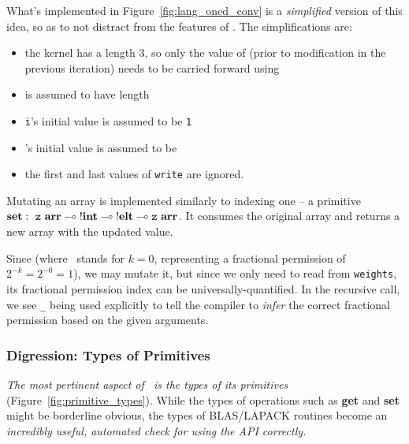 What's implemented in Figure~\ref{fig:lang_oned_conv} is a \emph{simplified}
version of this idea, so as to not distract from the features of \lang. The
simplifications are:
\begin{itemize}
    \item the kernel has a length 3, so only the value of 
        (prior to modification in the previous iteration) needs to be carried
        forward using 
    \item {} is assumed to have length 
    \item \texttt{i}'s initial value is assumed to be \texttt{1}
    \item {}'s initial value is assumed to be 
    \item the first and last values of \texttt{write} are ignored.
\end{itemize}

Mutating an array is implemented similarly to indexing one -- a primitive
$\mathbf{set}:\ {\texttt{z}\ \mathbf{arr}} \multimap {!\mathbf{int}} \multimap {!\mathbf{elt}} \multimap
{\texttt{z}\ \mathbf{arr}}$. It consumes the original array and returns a new array with
the updated value.

Since  (where \Zf\ stands for $k=0$, representing a
fractional permission of $2^{-k} = 2^{-0} = 1$), we may mutate it, but since we
only need to read from \texttt{weights}, its fractional permission index can be
universally-quantified. In the recursive call, we see \texttt{\_} being used
explicitly to tell the compiler to \emph{infer} the correct fractional
permission based on the given arguments.

\subsubsection{Digression: Types of Primitives}

\emph{The most pertinent aspect of \lang\ is the types of its primitives}
(Figure~\ref{fig:primitive_types}).  While the types of operations such as
\textbf{get} and \textbf{set} might be borderline obvious, the types of
BLAS/LAPACK routines become an \emph{incredibly useful, automated check for
using the API correctly.}

